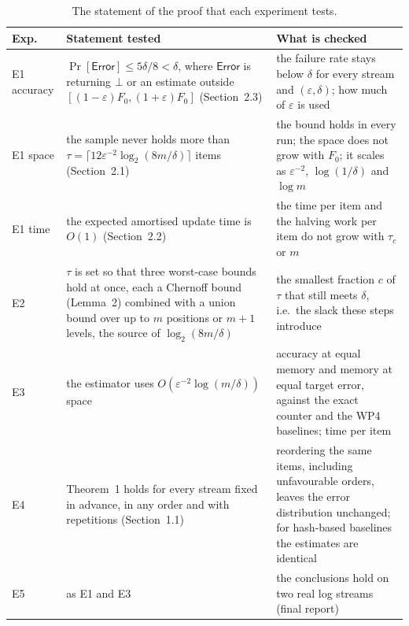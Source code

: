 \documentclass[11pt]{article}
\newcommand{\eps}{\varepsilon}
\newcommand{\Err}{\mathsf{Error}}
\begin{document}
\begin{table}[htbp]
\centering\small
\caption{The statement of the proof that each experiment tests.}\label{tab:proof-steps}
\begin{tabularx}{\linewidth}{@{}p{2.1cm}LL@{}}
\toprule
Exp. & Statement tested & What is checked \\
\midrule
E1 accuracy & $\Pr[\Err] \le 5\delta/8 < \delta$, where $\Err$ is returning
  $\bot$ or an estimate outside $[(1-\eps)F_0, (1+\eps)F_0]$ (Section~2.3) &
  the failure rate stays below $\delta$ for every stream and $(\eps,\delta)$;
  how much of $\eps$ is used \\
E1 space & the sample never holds more than
  $\tau = \lceil 12\eps^{-2}\log_2(8m/\delta) \rceil$ items (Section~2.1) &
  the bound holds in every run; the space does not grow with $F_0$; it scales
  as $\eps^{-2}$, $\log(1/\delta)$ and $\log m$ \\
E1 time & the expected amortised update time is $O(1)$ (Section~2.2) &
  the time per item and the halving work per item do not grow with $\tau_c$
  or $m$ \\
E2 & $\tau$ is set so that three worst-case bounds hold at once, each a
  Chernoff bound (Lemma~2) combined with a union bound over up to $m$
  positions or $m+1$ levels, the source of $\log_2(8m/\delta)$ &
  the smallest fraction $c$ of $\tau$ that still meets $\delta$, i.e.\ the
  slack these steps introduce \\
E3 & the estimator uses $O(\eps^{-2}\log(m/\delta))$ space &
  accuracy at equal memory and memory at equal target error, against the
  exact counter and the WP4 baselines; time per item \\
E4 & Theorem~1 holds for every stream fixed in advance, in any order and with
  repetitions (Section~1.1) & reordering the same items, including
  unfavourable orders, leaves the error distribution unchanged; for
  hash-based baselines the estimates are identical \\
E5 & as E1 and E3 & the conclusions hold on two real log streams (final
  report) \\
\bottomrule
\end{tabularx}
\end{table}
\end{document}
